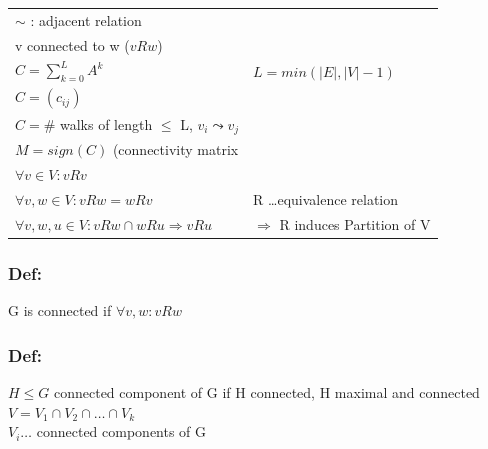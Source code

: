 \vspace{12pt}

\begin{tabular}{l l}
$\sim$ : adjacent relation \\

v connected to w ($vRw$) \\

$C = \sum_{k=0}^L A ^k$ 	& $ L = min(|E|, |V| -1)$ \\
$C=(c_{ij}) $ \\
$C = $\# walks of length $\leq$ L, $v_i \leadsto v_j$ \\

$M = sign(C)$ (connectivity matrix\\

$\forall v \in V: vRv$ \\
$\forall v,w \in V: vRw = wRv$ & R \ldots equivalence relation\\
$\forall v,w,u \in V: vRw \cap wRu \Rightarrow vRu$ & $ \Rightarrow$ R induces Partition of V \\

\end{tabular}


\subsubsection*{Def:}
G is connected if $\forall v,w: vRw$

\subsubsection*{Def:}
$ H \leq G$  connected component of G if H connected, H maximal and connected
$V = V_1 \cap V_2 \cap \ldots \cap V_k$ \\
$V_i \ldots $ connected components of G

